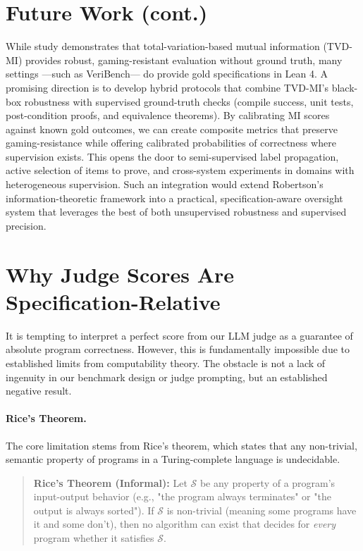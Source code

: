 \documentclass{article}
\begin{document}
\section{Future Work (cont.)}

While \citep{robertson2025stepbystep} study demonstrates that total-variation-based mutual information (TVD-MI) provides robust, gaming-resistant evaluation without ground truth, many settings —such as VeriBench— do provide gold specifications in Lean 4.
A promising direction is to develop hybrid protocols that combine TVD-MI’s black-box robustness with supervised ground-truth checks (compile success, unit tests, post-condition proofs, and equivalence theorems).
By calibrating MI scores against known gold outcomes, we can create composite metrics that preserve gaming-resistance while offering calibrated probabilities of correctness where supervision exists.
This opens the door to semi-supervised label propagation, active selection of items to prove, and cross-system experiments in domains with heterogeneous supervision.
Such an integration would extend Robertson’s information-theoretic framework into a practical, specification-aware oversight system that leverages the best of both unsupervised robustness and supervised precision.

\section{Why Judge Scores Are Specification-Relative}

It is tempting to interpret a perfect score from our LLM judge as a guarantee of absolute program correctness. However, this is fundamentally impossible due to established limits from computability theory. The obstacle is not a lack of ingenuity in our benchmark design or judge prompting, but an established negative result.

\paragraph{Rice’s Theorem.}
The core limitation stems from Rice’s theorem, which states that any non-trivial, semantic property of programs in a Turing-complete language is undecidable.

\begin{quote}
  \textbf{Rice's Theorem (Informal):} Let $\mathcal{S}$ be any property of a program's input-output behavior (e.g., "the program always terminates" or "the output is always sorted"). If $\mathcal{S}$ is non-trivial (meaning some programs have it and some don't), then no algorithm can exist that decides for \emph{every} program whether it satisfies $\mathcal{S}$.
\end{quote}
\end{document}

